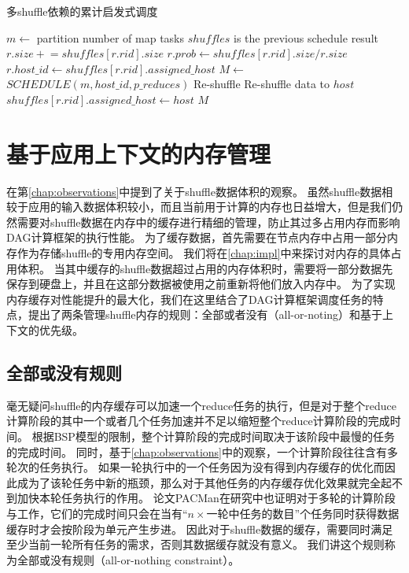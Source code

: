 \begin{algorithm}[H]
	\caption{多shuffle依赖的累计启发式调度}
	\label{mhminheap}
	\begin{algorithmic}[1]
		\small
			\State $m\gets$ partition number of map tasks
			\Comment $shuffles$ is the previous schedule result
				\State $r.size \mathrel{+}= shuffles\left[r.rid\right].size$
					\State $r.prob\gets shuffles\left[r.rid\right].size / r.size$
					\State $r.host\_id\gets shuffles\left[r.rid\right].assigned\_host$
				\EndIf
			\EndFor
			\State $M\gets$ $SCHEDULE\left(m, host\_id, p\_reduces\right)$
				\Comment Re-shuffle
					\State Re-shuffle data to $host$
					\State $shuffles\left[r.rid\right].assigned\_host\gets host$
					\EndIf
				\EndFor
			\EndFor
			\Return $M$
		\EndProcedure
	\end{algorithmic}
\end{algorithm}

\section{基于应用上下文的内存管理}

在第\ref{chap:observations}中提到了关于shuffle数据体积的观察。
虽然shuffle数据相较于应用的输入数据体积较小，而且当前用于计算的内存也日益增大，但是我们仍然需要对shuffle数据在内存中的缓存进行精细的管理，防止其过多占用内存而影响DAG计算框架的执行性能。
为了缓存数据，首先需要在节点内存中占用一部分内存作为存储shuffle的专用内存空间。
我们将在\ref{chap:impl}中来探讨对内存的具体占用体积。
当其中缓存的shuffle数据超过占用的内存体积时，需要将一部分数据先保存到硬盘上，并且在这部分数据被使用之前重新将他们放入内存中。
为了实现内存缓存对性能提升的最大化，我们在这里结合了DAG计算框架调度任务的特点，提出了两条管理shuffle内存的规则：全部或者没有（all-or-noting）和基于上下文的优先级。

\subsection{全部或没有规则}

毫无疑问shuffle的内存缓存可以加速一个reduce任务的执行，但是对于整个reduce计算阶段的其中一个或者几个任务加速并不足以缩短整个reduce计算阶段的完成时间。
根据BSP模型的限制，整个计算阶段的完成时间取决于该阶段中最慢的任务的完成时间。
同时，基于\ref{chap:observations}中的观察，一个计算阶段往往含有多轮次的任务执行。
如果一轮执行中的一个任务因为没有得到内存缓存的优化而因此成为了该轮任务中新的瓶颈，那么对于其他任务的内存缓存优化效果就完全起不到加快本轮任务执行的作用。
论文PACMan\cite{pacman}在研究中也证明对于多轮的计算阶段与工作，它们的完成时间只会在当有“$n \times$一轮中任务的数目”个任务同时获得数据缓存时才会按阶段为单元产生步进。
因此对于shuffle数据的缓存，需要同时满足至少当前一轮所有任务的需求，否则其数据缓存就没有意义。
我们讲这个规则称为全部或没有规则（all-or-nothing constraint）。

